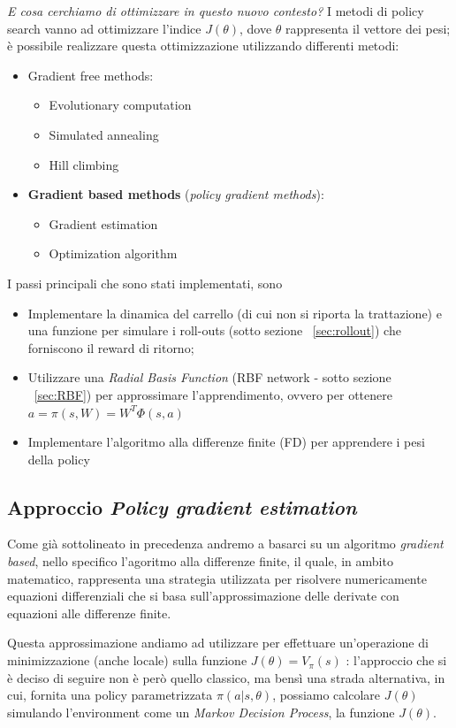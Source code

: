 \textit{E cosa cerchiamo di ottimizzare in questo nuovo contesto?}
I metodi di policy search vanno ad ottimizzare l'indice $J(\theta)$, dove $\theta$ rappresenta il vettore dei pesi; è possibile realizzare questa ottimizzazione utilizzando differenti metodi:
\begin{itemize}
	\item Gradient free methods:
	\begin{itemize}
		\item Evolutionary computation
		\item Simulated annealing
		\item Hill climbing
	\end{itemize}
	\item \textbf{Gradient based methods} (\textit{policy gradient methods}):
	\begin{itemize}
		\item  Gradient estimation 
		\item Optimization algorithm
	\end{itemize}
\end{itemize}

I passi principali che sono stati implementati, sono
\begin{itemize}
	\item Implementare la dinamica del carrello (di cui non si riporta la trattazione) e una funzione per simulare i roll-outs (sotto sezione ~\ref{sec:rollout}) che forniscono il reward di ritorno;
	\item Utilizzare una \textit{Radial Basis Function} (RBF network - sotto sezione ~\ref{sec:RBF}) per approssimare l'apprendimento, ovvero per ottenere $a = \pi(s,W) = W^T\Phi(s,a)$
	\item Implementare l'algoritmo alla differenze finite (FD) per apprendere i pesi della policy
\end{itemize}

\subsection{Approccio \textit{Policy gradient estimation}}
Come già sottolineato in precedenza andremo a basarci su un algoritmo \textit{gradient based}, nello specifico l'agoritmo alla differenze finite, il quale, in ambito matematico, rappresenta una strategia utilizzata per risolvere numericamente equazioni differenziali che si basa sull'approssimazione delle derivate con equazioni alle differenze finite.

Questa approssimazione andiamo ad utilizzare per effettuare un'operazione di minimizzazione (anche locale) sulla funzione $J(\theta) = V_\pi(s)$ \label{eq:J_function_to_minimize}: l'approccio che si è deciso di seguire non è però quello classico, ma bensì una strada alternativa, in cui, fornita una policy parametrizzata $\pi(a|s,\theta)$, possiamo calcolare $J(\theta)$ simulando l'environment come un \textit{Markov Decision Process}, la funzione $J(\theta)$. 

